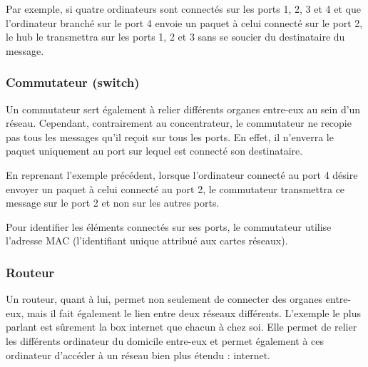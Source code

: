 Par exemple, si quatre ordinateurs sont connectés sur les ports 1, 2, 3 et 4 et que l'ordinateur branché sur le port 4 envoie un paquet à celui connecté sur le port 2, le hub le transmettra sur les ports 1, 2 et 3 sans se soucier du destinataire du message.

\subsubsection{Commutateur (switch)}
\label{sec:commutateur}
Un commutateur sert également à relier différents organes entre-eux au sein d'un réseau. Cependant, contrairement au concentrateur, le commutateur ne recopie pas tous les messages qu'il reçoit sur tous les ports. En effet, il n'enverra le paquet uniquement au port sur lequel est connecté son destinataire.

En reprenant l'exemple précédent, lorsque l'ordinateur connecté au port 4 désire envoyer un paquet à celui connecté au port 2, le commutateur transmettra ce message sur le port 2 et non sur les autres ports.

Pour identifier les éléments connectés sur ses ports, le commutateur utilise l'adresse MAC (l'identifiant unique attribué aux cartes réseaux).

\subsubsection{Routeur}
\label{sec:routeur}
Un routeur, quant à lui, permet non seulement de connecter des organes entre-eux, mais il fait également le lien entre deux réseaux différents. L'exemple le plus parlant est sûrement la box internet que chacun à chez soi. Elle permet de relier les différents ordinateur du domicile entre-eux et permet également à ces ordinateur d'accéder à un réseau bien plus étendu : internet.
